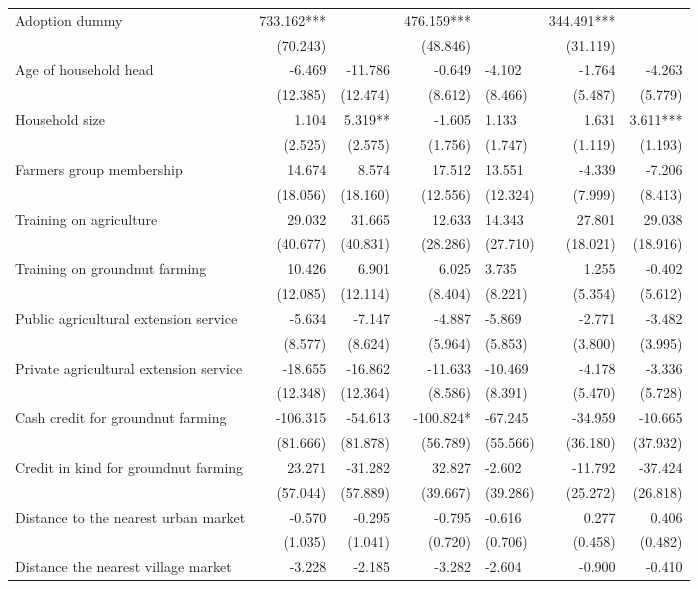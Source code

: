 \documentclass[
]{article}
\begin{document}
\begin{landscape}
\begin{longtable}[t]{lrrrlrr}
\endfoot
\bottomrule
\endlastfoot
Adoption dummy & 733.162*** &  & 476.159*** &  & 344.491*** & \\
 & (70.243) &  & (48.846) &  & (31.119) & \\
Age of household head & -6.469 & -11.786 & -0.649 & -4.102 & -1.764 & -4.263\\
 & (12.385) & (12.474) & (8.612) & (8.466) & (5.487) & (5.779)\\
Household size & 1.104 & 5.319** & -1.605 & 1.133 & 1.631 & 3.611***\\
 & (2.525) & (2.575) & (1.756) & (1.747) & (1.119) & (1.193)\\
Farmers group membership & 14.674 & 8.574 & 17.512 & 13.551 & -4.339 & -7.206\\
 & (18.056) & (18.160) & (12.556) & (12.324) & (7.999) & (8.413)\\
Training on agriculture & 29.032 & 31.665 & 12.633 & 14.343 & 27.801 & 29.038\\
 & (40.677) & (40.831) & (28.286) & (27.710) & (18.021) & (18.916)\\
Training on groundnut farming & 10.426 & 6.901 & 6.025 & 3.735 & 1.255 & -0.402\\
 & (12.085) & (12.114) & (8.404) & (8.221) & (5.354) & (5.612)\\
Public agricultural extension service & -5.634 & -7.147 & -4.887 & -5.869 & -2.771 & -3.482\\
 & (8.577) & (8.624) & (5.964) & (5.853) & (3.800) & (3.995)\\
Private agricultural extension service & -18.655 & -16.862 & -11.633 & -10.469 & -4.178 & -3.336\\
 & (12.348) & (12.364) & (8.586) & (8.391) & (5.470) & (5.728)\\
Cash credit for groundnut farming & -106.315 & -54.613 & -100.824* & -67.245 & -34.959 & -10.665\\
 & (81.666) & (81.878) & (56.789) & (55.566) & (36.180) & (37.932)\\
Credit in kind for groundnut farming & 23.271 & -31.282 & 32.827 & -2.602 & -11.792 & -37.424\\
 & (57.044) & (57.889) & (39.667) & (39.286) & (25.272) & (26.818)\\
Distance to the nearest urban market & -0.570 & -0.295 & -0.795 & -0.616 & 0.277 & 0.406\\
 & (1.035) & (1.041) & (0.720) & (0.706) & (0.458) & (0.482)\\
Distance the nearest village market & -3.228 & -2.185 & -3.282 & -2.604 & -0.900 & -0.410\\

\end{longtable}
\end{landscape}
\end{document}
